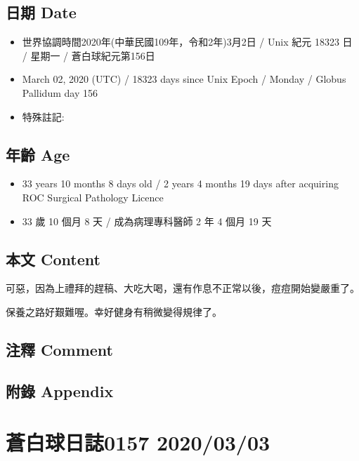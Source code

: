 \documentclass[a5paper, 12pt
]{book}
\providecommand{\tightlist}{%
  \setlength{\itemsep}{0pt}\setlength{\parskip}{0pt}}
\begin{document}
\hypertarget{ux65e5ux671f-date-1}{%
\subsection{日期 Date}\label{ux65e5ux671f-date-1}}

\begin{itemize}
\tightlist
\item
  世界協調時間2020年(中華民國109年，令和2年)3月2日 / Unix 紀元 18323 日
  / 星期一 / 蒼白球紀元第156日
\item
  March 02, 2020 (UTC) / 18323 days since Unix Epoch / Monday / Globus
  Pallidum day 156
\item
  特殊註記:
\end{itemize}

\hypertarget{ux5e74ux9f61-age-1}{%
\subsection{年齡 Age}\label{ux5e74ux9f61-age-1}}

\begin{itemize}
\tightlist
\item
  33 years 10 months 8 days old / 2 years 4 months 19 days after
  acquiring ROC Surgical Pathology Licence
\item
  33 歲 10 個月 8 天 / 成為病理專科醫師 2 年 4 個月 19 天
\end{itemize}

\hypertarget{ux672cux6587-content-1}{%
\subsection{本文 Content}\label{ux672cux6587-content-1}}

可惡，因為上禮拜的趕稿、大吃大喝，還有作息不正常以後，痘痘開始變嚴重了。

保養之路好艱難喔。幸好健身有稍微變得規律了。

\hypertarget{ux6ce8ux91cb-comment-1}{%
\subsection{注釋 Comment}\label{ux6ce8ux91cb-comment-1}}

\hypertarget{ux9644ux9304-appendix-1}{%
\subsection{附錄 Appendix}\label{ux9644ux9304-appendix-1}}

\hypertarget{ux84bcux767dux7403ux65e5ux8a8c0157-20200303}{%
\section{蒼白球日誌0157
2020/03/03}\label{ux84bcux767dux7403ux65e5ux8a8c0157-20200303}}
\end{document}
